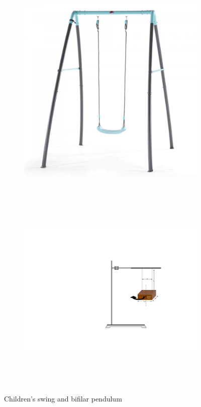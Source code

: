 \documentclass[a4paper,12pt]{article}
\theoremstyle{definition}
\begin{document}
\begin{figure}[h]
\centering
\begin{subfigure}{.5\textwidth}
  \centering
  \includegraphics[width=.8\linewidth,height=10cm,keepaspectratio]{swing}
  \caption{}
  \label{fig:sub1}
\end{subfigure}%
\begin{subfigure}{.5\textwidth}
  \centering
  \includegraphics[width=.7\linewidth,height=10cm,keepaspectratio]{setup.pdf}
  \caption{}
  \label{fig:sub2}
\end{subfigure}
\caption{Children's swing and bifilar pendulum}
\label{fig:test}
\end{figure}
\end{document}

